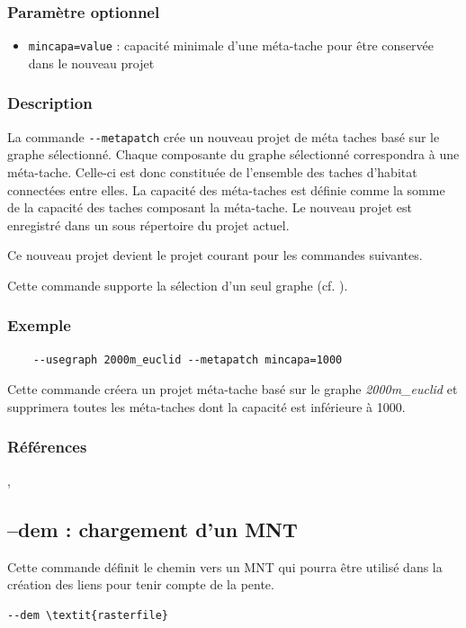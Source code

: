 \documentclass[a4paper,10pt]{report}
\begin{document}
\subsubsection{Paramètre optionnel}
\begin{itemize}
	\item \verb|mincapa=value| : capacité minimale d'une méta-tache pour être conservée dans le nouveau projet
\end{itemize}

\subsubsection{Description}
La commande \verb|--metapatch| crée un nouveau projet de méta taches basé sur le graphe sélectionné. 
Chaque composante du graphe sélectionné correspondra à une méta-tache. Celle-ci est donc constituée de l’ensemble des taches d’habitat connectées entre elles.
La capacité des méta-taches est définie comme la somme de la capacité des taches composant la méta-tache. Le nouveau projet est enregistré dans un sous répertoire du projet actuel.

Ce nouveau projet devient le projet courant pour les commandes suivantes.

Cette commande supporte la sélection d'un seul graphe (cf. ).

\subsubsection{Exemple}
\begin{Verbatim}
	--usegraph 2000m_euclid --metapatch mincapa=1000
\end{Verbatim}
Cette commande créera un projet méta-tache basé sur le graphe \textit{2000m\_euclid} et supprimera toutes les méta-taches dont la capacité est inférieure à 1000.

\subsubsection{Références}
\cite{2015_monkey}, \cite{2016_campagnole}

\subsection{--dem : chargement d'un MNT}
Cette commande définit le chemin vers un MNT qui pourra être utilisé dans la création des liens pour tenir compte de la pente.
\begin{Verbatim}[commandchars=\\\{\}]
--dem \textit{rasterfile}
\end{Verbatim}
\end{document}
